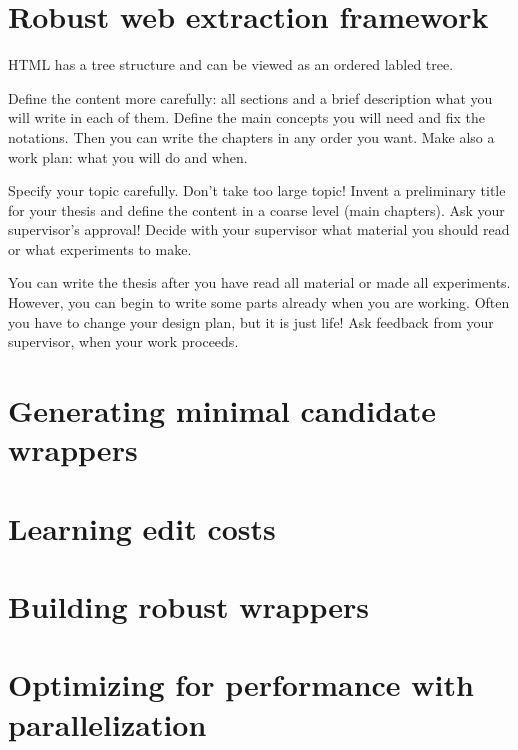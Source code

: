 \chapter{Robust web extraction framework}


HTML has a tree structure and can be viewed as an ordered labled tree.

Define the content more carefully: all sections and a brief description what you will write in each of them. Define the main concepts you will need and fix the notations. Then you can write the chapters in any order you want. Make also a work plan: what you will do and when.

Specify your topic carefully. Don’t take too large topic!  Invent a preliminary title for your thesis and define the content in a coarse level (main chapters). Ask your supervisor’s approval! Decide with your supervisor what material you should read or what experiments to make.  

You can write the thesis after you have read all material or made all experiments. However, you can begin to write some parts already when you are working. Often you have to change your design plan, but it is just life! Ask feedback from your supervisor, when your work proceeds.

\chapter{Generating minimal candidate wrappers}
\chapter{Learning edit costs}
\chapter{Building robust wrappers}
\chapter{Optimizing for performance with parallelization}


